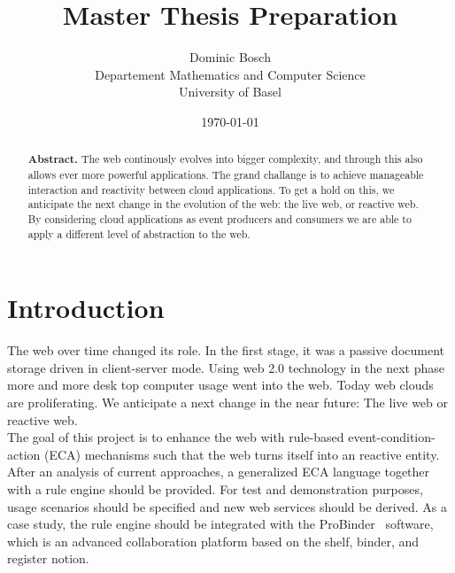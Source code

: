 \documentclass[11pt,twocolumn]{article}
\begin{document}
\title{Master Thesis Preparation}
\date{\today}
\author{Dominic Bosch \\ Departement Mathematics and Computer Science \\ University of Basel}

\maketitle
\renewcommand{\abstractname}{}
\begin{abstract}
\textbf{Abstract.} The web continously evolves into bigger complexity, and through this also allows ever more powerful applications. The grand challange is to achieve manageable interaction and reactivity between cloud applications. To get a hold on this, we anticipate the next change in the evolution of the web: the live web, or reactive web. By considering cloud applications as event producers and consumers we are able to apply a different level of abstraction to the web.
\end{abstract}

\section{Introduction}
The web over time changed its role. In the first stage, it was a passive document storage driven in client-server mode. Using web 2.0 technology in the next phase more and more desk top computer usage went into the web. Today web clouds are proliferating. We anticipate a next change in the near future: The live web or reactive web.
\\
The goal of this project is to enhance the web with rule-based event-condition-action (ECA) mechanisms  such that the web turns itself into an reactive entity. After an analysis of current approaches, a generalized ECA language together with a rule engine should be provided. For test and demonstration purposes, usage scenarios should be specified and new web services should be derived. As a case study, the rule engine should be integrated with the ProBinder~\cite{wwwprobinder} software, which is an advanced collaboration platform based on the shelf, binder, and register notion.
\end{document}
